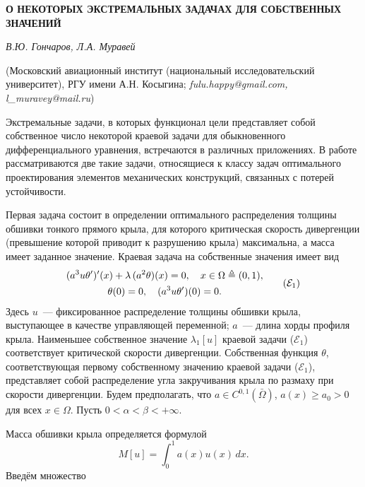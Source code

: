 \begin{center}
    {\bf О НЕКОТОРЫХ ЭКСТРЕМАЛЬНЫХ ЗАДАЧАХ ДЛЯ СОБСТВЕННЫХ ЗНАЧЕНИЙ}

    {\it В.Ю. Гончаров, Л.А. Муравей }
	
    (Московский авиационный институт (национальный исследовательский университет), РГУ имени А.Н. Косыгина; {\it fulu.happy@gmail.com, l\_muravey@mail.ru})
	
\end{center}




\par
Экстремальные задачи, в которых функционал цели
\linebreak
представляет
собой собственное число
некоторой краевой задачи для обыкновенного дифференциального уравнения,
встречаются в различных приложениях.
%
%
%
В работе рассматриваются две такие задачи, относящиеся к классу задач оптимального проектирования
элементов механических конструкций, связанных с потерей устойчивости.
%
%
%
%
%
\par
Первая задача состоит в определении оптимального распределения толщины обшивки тонкого прямого
крыла,
для которого критическая скорость дивергенции
(превышение которой приводит к разрушению крыла)
максимальна, а масса имеет заданное значение.
%
%
%
Краевая задача на собственные значения имеет вид
\[
\begin{gathered}
(a^3 u \theta')'(x) + \lambda \, (a^2 \theta)(x) = 0,
\quad
x \in \Omega \triangleq (0, 1),
\\
\theta(0) = 0,
\quad
(a^3 u \theta')(0) = 0.
\end{gathered}
\tag{$\mathcal{E}_1$}
\]
Здесь
$u$~--- фиксированное распределение толщины обшивки крыла,
выступающее в качестве управляющей переменной;
$a$~--- длина хорды профиля крыла.
%
%
%
Наименьшее собственное значение $\lambda_1[u]$ краевой задачи
($\mathcal{E}_1$)
соответствует критической
скорости дивергенции.
%
%
%
Собственная функция $\theta$,
соответствующая первому собственному
значению краевой задачи
($\mathcal{E}_1$),
представляет собой распределение угла закручивания крыла по
размаху при скорости дивергенции.
%
%
%
Будем предполагать,
что
$a \in C^{0, 1}(\bar{\Omega})$, $a(x) \geq a_0 > 0$ для всех $x \in \Omega$.
%
%
%
Пусть
$0 < \alpha < \beta < +\infty$.
%
%
%
%
%
\par
Масса обшивки крыла определяется формулой
\[
M[u] = \int_0^1 a(x) u(x) \, dx.
\]
Введём множество
